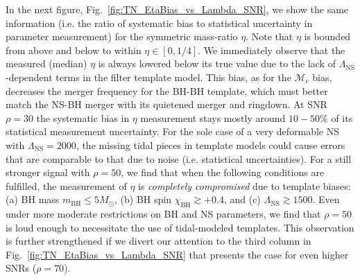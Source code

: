 \documentclass[aps,prd,amsmath,floats,floatfix, twocolumn,
superscriptaddress,nofootinbib,showpacs]{revtex4-1}
\newcommand{\lambdans}{\Lambda_\mathrm{NS}}
\newcommand{\chibh}{\chi_\mathrm{BH}}
\newcommand{\mbh}{m_\mathrm{BH}}
\newcommand{\mchirp}{\mathcal{M}_c}
\begin{document}
In the next figure, Fig.~\ref{fig:TN_EtaBias_vs_Lambda_SNR}, we show the same
information (i.e. the ratio of systematic bias to statistical uncertainty in parameter
measurement) for the symmetric mass-ratio $\eta$. Note that $\eta$
is bounded from above and below to within $\eta\in[0, 1/4]$. We immediately observe
that the measured (median) $\eta$ is always lowered below its true value due to the 
lack of $\lambdans$-dependent terms in the filter template model. This bias, as for 
the $\mchirp$ bias, decreases the merger frequency for the BH-BH template, which must
better match the NS-BH merger with its quietened merger and ringdown. At SNR $\rho=30$
the systematic bias in $\eta$ measurement stays mostly around $10-50\%$ of its statistical
measurement uncertainty. For the sole case of a very deformable NS with $\lambdans=2000$,
the missing tidal pieces in template models could cause errors that are comparable to 
that due to noise (i.e. statistical uncertainties). For a still stronger signal with 
$\rho=50$, we find that 
when the following conditions are fulfilled, the measurement of $\eta$ is {\it completely
compromised} due to template biases: (a) BH mass $\mbh\leq 5M_\odot$, (b) BH spin
$\chibh\gtrsim +0.4$, and (c) $\lambdans\gtrsim 1500$. Even under more moderate restrictions
on BH and NS parameters, we find that $\rho=50$ is loud enough to necessitate the 
use of tidal-modeled templates. This observation is further strengthened if we divert 
our attention to the third column in Fig.~\ref{fig:TN_EtaBias_vs_Lambda_SNR} that presents
the case for even higher SNRs ($\rho=70$).
\end{document}
